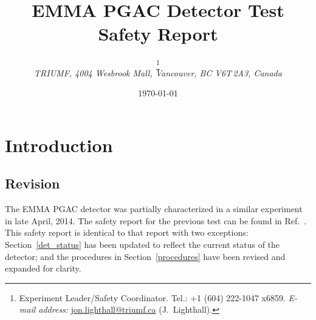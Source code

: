\title{EMMA PGAC Detector Test\\ Safety Report}
\author{\authname\footnote{Experiment Leader/Safety Coordinator.  Tel.: +1 (604) 222-1047 x6859. \newline  \textit{\hspace*{1.5em} E-mail address:} \href{mailto:jon.lighthall@triumf.ca}{jon.lighthall@triumf.ca} (J.\ Lighthall).} \\ \small \itshape TRIUMF, 4004 Wesbrook Mall, Vancouver, BC V6T\,2A3, Canada}
\date{\small \longusdate \today}%
\maketitle
\pagestyle{fancy}
\lhead{}
\renewcommand{\headrulewidth}{0pt}
\section{Introduction}
\subsection{Revision}
The EMMA PGAC detector was partially characterized in a similar experiment in late April, 2014. The safety report for the previous test can be found in Ref.~\cite{old_safety}. This safety report is identical to that report with two exceptions: Section~\ref{det_status} has been updated to reflect the current status of the detector; and the procedures in Section~\ref{procedures} have been revised and expanded for clarity.
